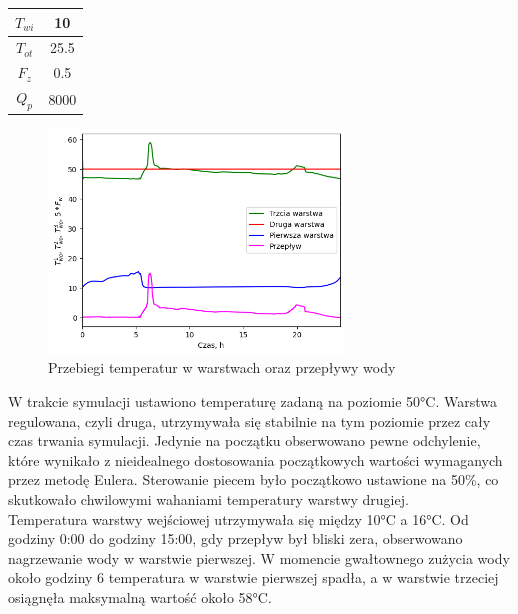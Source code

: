 \documentclass[a4paper,twoside,12pt]{book}
\begin{document}
\begin{table}[!h]
\begin{tabular}{|c|ccc|}
    $T_{wi}$                                                    & \multicolumn{3}{c|}{10}                                              \\ \hline
    $T_{ot}$                                                    & \multicolumn{3}{c|}{25.5}                                            \\ \hline
    $F_z$                                                       & \multicolumn{3}{c|}{0.5}                                             \\ \hline
    $Q_p$                                                       & \multicolumn{3}{c|}{8000}                                            \\ \hline
  \end{tabular}
\end{table}

\newpage
\begin{figure}[!h]
  \centering
  \includegraphics[width=0.7\textwidth]{img/Przebiegi.png}
  \caption{Przebiegi temperatur w warstwach oraz przepływy wody}
  \label{fig:etykieta-rysunku}
\end{figure}
W trakcie symulacji ustawiono temperaturę zadaną na poziomie 50°C. Warstwa regulowana, czyli druga, utrzymywała się stabilnie na tym poziomie przez cały czas trwania symulacji. Jedynie na początku obserwowano pewne odchylenie, które wynikało z nieidealnego dostosowania początkowych wartości wymaganych przez metodę Eulera. Sterowanie piecem było początkowo ustawione na 50\%, co skutkowało chwilowymi wahaniami temperatury warstwy drugiej.\\

Temperatura warstwy wejściowej utrzymywała się między 10°C a 16°C. Od godziny 0:00 do godziny 15:00, gdy przepływ był bliski zera, obserwowano nagrzewanie wody w warstwie pierwszej. W momencie gwałtownego zużycia wody około godziny 6 temperatura w warstwie pierwszej spadła, a w warstwie trzeciej osiągnęła maksymalną wartość około 58°C.\\
\end{document}

